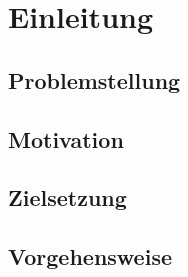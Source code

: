 \chapter{Einleitung}

\section{Problemstellung} 


\section{Motivation} 


\section{Zielsetzung} 



\section{Vorgehensweise} 

